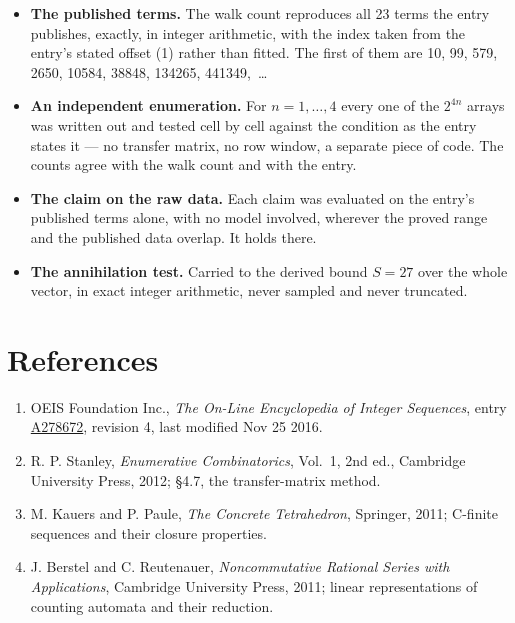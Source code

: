 \documentclass[11pt]{article}
\theoremstyle{definition}
\begin{document}
\begin{itemize}

\item {\bfseries The published terms.} The walk count reproduces all 23 terms the entry publishes, exactly, in integer arithmetic, with the index taken from the entry's stated offset (1) rather than fitted. The first of them are 10, 99, 579, 2650, 10584, 38848, 134265, 441349,~\dots

\item {\bfseries An independent enumeration.} For $n = 1,\dots,4$ every one of the $2^{4n}$ arrays was written out and tested cell by cell against the condition as the entry states it --- no transfer matrix, no row window, a separate piece of code. The counts agree with the walk count and with the entry.

\item {\bfseries The claim on the raw data.} Each claim was evaluated on the entry's published terms alone, with no model involved, wherever the proved range and the published data overlap. It holds there.

\item {\bfseries The annihilation test.} Carried to the derived bound $S = 27$ over the whole vector, in exact integer arithmetic, never sampled and never truncated.

\end{itemize}

\section{References}

\begin{enumerate}

\item OEIS Foundation Inc., \emph{The On-Line Encyclopedia of Integer Sequences}, entry \href{https://oeis.org/A278672}{A278672}, revision 4, last modified Nov 25 2016.

\item R. P. Stanley, \emph{Enumerative Combinatorics}, Vol.~1, 2nd ed., Cambridge University Press, 2012; \S4.7, the transfer-matrix method.

\item M. Kauers and P. Paule, \emph{The Concrete Tetrahedron}, Springer, 2011; C-finite sequences and their closure properties.

\item J. Berstel and C. Reutenauer, \emph{Noncommutative Rational Series with Applications}, Cambridge University Press, 2011; linear representations of counting automata and their reduction.

\end{enumerate}
\end{document}
